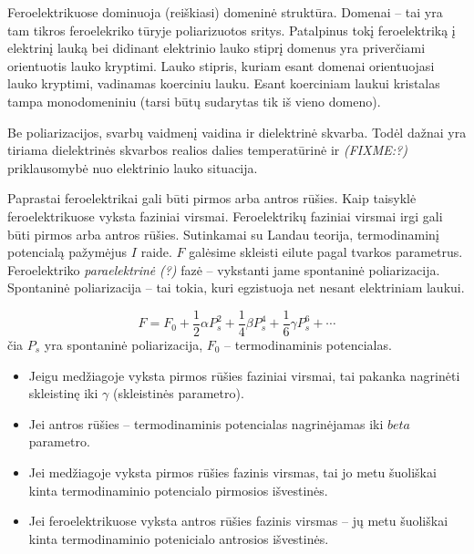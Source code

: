 Feroelektrikuose dominuoja (reiškiasi) domeninė struktūra. Domenai
– tai yra tam tikros feroelekriko tūryje poliarizuotos sritys.
Patalpinus tokį feroelektriką į elektrinį lauką bei didinant
elektrinio lauko stiprį domenus yra priverčiami orientuotis lauko
kryptimi. Lauko stipris, kuriam esant domenai orientuojasi lauko
kryptimi, vadinamas koerciniu lauku. Esant koerciniam laukui kristalas
tampa monodomeniniu (tarsi būtų sudarytas tik iš vieno domeno).

Be poliarizacijos, svarbų vaidmenį vaidina ir dielektrinė skvarba.
Todėl dažnai yra tiriama dielektrinės skvarbos realios dalies
temperatūrinė ir \textit{(FIXME:?)} priklausomybė nuo elektrinio lauko
situacija.

Paprastai feroelektrikai gali būti pirmos arba antros rūšies.
Kaip taisyklė feroelektrikuose vyksta faziniai virsmai.
Feroelektrikų faziniai virsmai irgi gali būti pirmos arba antros
rūšies. Sutinkamai su Landau teorija, termodinaminį
potencialą pažymėjus $I$ raide. $F$ galėsime skleisti eilute pagal
tvarkos parametrus. Feroelektriko \textit{paraelektrinė} \textit{(?)}
fazė – vykstanti jame spontaninė poliarizacija. Spontaninė
poliarizacija – tai tokia, kuri egzistuoja net nesant elektriniam
laukui.

\begin{equation*}
  F = F_0 + \frac{1}{2}\alpha P_s^2 +
  \frac{1}{4}\beta P_s^4 + \frac{1}{6}\gamma P_s^6 + \cdots
\end{equation*}
čia $P_s$ yra spontaninė poliarizacija, $F_0$ – termodinaminis potencialas.

\begin{itemize}
  \item Jeigu medžiagoje vyksta pirmos rūšies faziniai virsmai,
    tai pakanka nagrinėti skleistinę iki $\gamma$ (skleistinės
    parametro).
  \item Jei antros rūšies – termodinaminis potencialas nagrinėjamas
    iki $beta$ parametro.
\end{itemize}

\begin{itemize}
  \item Jei medžiagoje vyksta pirmos rūšies fazinis virsmas,
    tai jo metu šuoliškai kinta termodinaminio potencialo pirmosios
    išvestinės.
  \item Jei feroelektrikuose vyksta antros rūšies fazinis virsmas
    – jų metu šuoliškai kinta termodinaminio potenicialo antrosios
    išvestinės.
\end{itemize}

